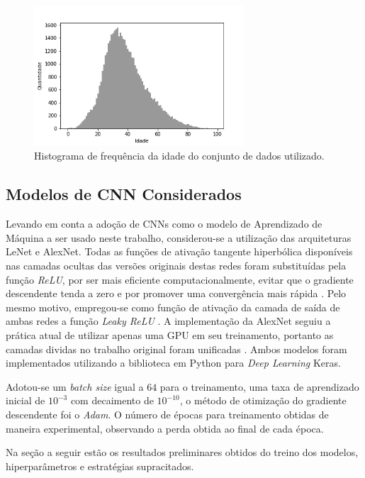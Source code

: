 \begin{figure}
    \centering
     \includegraphics[width=0.7\textwidth]{img/idade_hist_clean}
     \caption{Histograma de frequência da idade do conjunto de dados utilizado.}
     \label{fig:hist}
\end{figure}

\subsection{Modelos de CNN Considerados}
Levando em conta a adoção de CNNs como o modelo de Aprendizado de Máquina a ser usado neste trabalho, considerou-se a utilização das arquiteturas LeNet e AlexNet. Todas as funções de ativação tangente hiperbólica disponíveis nas camadas ocultas das versões originais destas redes foram substituídas pela função \emph{ReLU}, por ser mais eficiente computacionalmente, evitar que o gradiente descendente tenda a zero e por promover uma convergência mais rápida \cite{maas2013rectifier}. Pelo mesmo motivo, empregou-se como função de ativação da camada de saída de ambas redes a função \emph{Leaky ReLU} \cite{leaky_relu}. A implementação da AlexNet seguiu a prática atual de utilizar apenas uma GPU em seu treinamento, portanto as camadas dividas no trabalho original foram unificadas \cite{tensorflow:alexnet}. Ambos modelos foram implementados utilizando a biblioteca em Python para \emph{Deep Learning} Keras.

Adotou-se um \emph{batch size} igual a $64$ para o treinamento, uma taxa de aprendizado inicial de $10^{-3}$ com decaimento de $10^{-10}$, o método de otimização do gradiente descendente foi o \emph{Adam}. O número de épocas para treinamento obtidas de maneira experimental, observando a perda obtida ao final de cada época.

Na seção a seguir estão os resultados preliminares obtidos do treino dos modelos, hiperparâmetros e estratégias supracitados.
